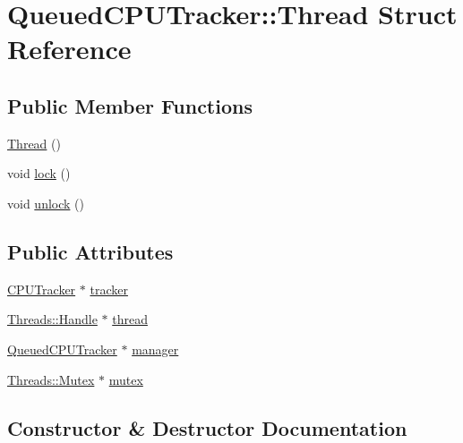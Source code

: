 \hypertarget{struct_queued_c_p_u_tracker_1_1_thread}{}\section{Queued\+C\+P\+U\+Tracker\+:\+:Thread Struct Reference}
\label{struct_queued_c_p_u_tracker_1_1_thread}
\subsection*{Public Member Functions}
\begin{DoxyCompactItemize}
\item 
\hyperlink{struct_queued_c_p_u_tracker_1_1_thread_ac61c1194e3b4dde0661c240078985bba}{Thread} ()
\item 
void \hyperlink{struct_queued_c_p_u_tracker_1_1_thread_ae44d1dc88e1458d8fab64e1930a4a052}{lock} ()
\item 
void \hyperlink{struct_queued_c_p_u_tracker_1_1_thread_af68d2a3c9c4b9a9eb7368c40baa12e96}{unlock} ()
\end{DoxyCompactItemize}
\subsection*{Public Attributes}
\begin{DoxyCompactItemize}
\item 
\hyperlink{class_c_p_u_tracker}{C\+P\+U\+Tracker} $\ast$ \hyperlink{struct_queued_c_p_u_tracker_1_1_thread_a03a8b50f8a9667f41a4eb72754ec2a69}{tracker}
\item 
\hyperlink{struct_threads_1_1_handle}{Threads\+::\+Handle} $\ast$ \hyperlink{struct_queued_c_p_u_tracker_1_1_thread_a57d33b7cdece9a412b3baa33481645d1}{thread}
\item 
\hyperlink{class_queued_c_p_u_tracker}{Queued\+C\+P\+U\+Tracker} $\ast$ \hyperlink{struct_queued_c_p_u_tracker_1_1_thread_a0b9c0c09951de89994083affe46fda48}{manager}
\item 
\hyperlink{struct_threads_1_1_mutex}{Threads\+::\+Mutex} $\ast$ \hyperlink{struct_queued_c_p_u_tracker_1_1_thread_a230c0eecf62744fe0fe2b9892412a122}{mutex}
\end{DoxyCompactItemize}


\subsection{Constructor \& Destructor Documentation}

